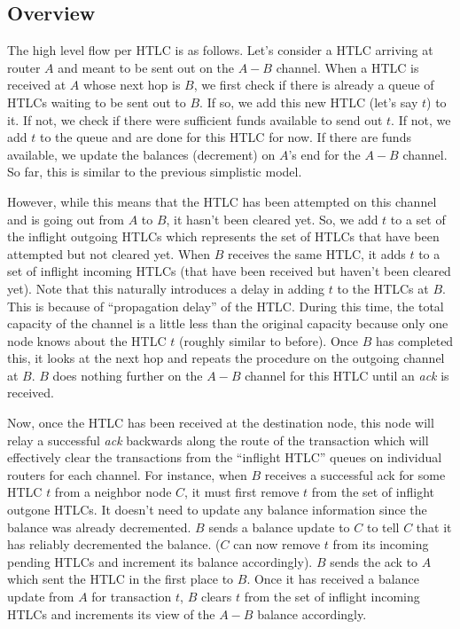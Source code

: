 \documentclass[a4paper]{article}
\newcommand{\NewPara}[1]{\noindent{\bf #1}}
\begin{document}
\subsection{Overview}
\NewPara{Sending out HTLCs} The high level flow per HTLC is as follows. Let's consider a HTLC arriving at router $A$ and meant to be sent out on the $A-B$ channel. When a HTLC is received at 
$A$ whose next hop is $B$, we first check if there is already a queue of HTLCs waiting to be sent out to $B$. If so, we add this new HTLC (let's say $t$) to it. If not, we check 
if there were sufficient funds available to send out $t$. If not, we add $t$ to the queue and are done for this HTLC for now. If there are funds available, 
we update the balances (decrement) on $A$'s end for the $A-B$ channel. So far, this is similar to the previous simplistic model. 

However, while this means that the HTLC has been attempted on this channel and is going out from $A$ to $B$, it hasn't been cleared yet. So, we add $t$ to a set of the inflight
outgoing HTLCs which represents the set of HTLCs that have been attempted but not cleared yet. When $B$ receives the same HTLC, it adds $t$ to a set of inflight incoming HTLCs 
(that have been received but haven't been cleared yet). Note that this naturally introduces a delay in adding $t$ to the HTLCs at $B$.
This is because of ``propagation delay'' of the HTLC. During this time, the total capacity of the channel is a little less than the original capacity because only one node knows
about the HTLC $t$ (roughly similar to before). Once $B$ has completed this, it looks at the next hop and repeats the procedure on the outgoing channel at $B$. $B$ does nothing further
on the $A-B$ channel for this HTLC until an {\em{ack}} is received.

\bigskip

\NewPara{Responding to Successful Acks} Now, once the HTLC has been received at the destination node, this node will relay a successful {\em{ack}} backwards along the route of the transaction which will effectively clear 
the transactions from the ``inflight HTLC'' queues on individual routers for each channel. For instance, when $B$ receives a successful ack for some HTLC
$t$ from a neighbor node $C$, it must first remove $t$ from the set of inflight outgone HTLCs. It doesn't need to update
any balance information since the balance was already decremented. $B$ sends a balance update to $C$ to tell $C$ that it has reliably decremented the balance. ($C$ can now remove $t$ from its incoming pending HTLCs and 
increment its balance accordingly).
$B$ sends the ack to $A$ which sent the HTLC in the first place to $B$. Once it has received a balance update from $A$ for transaction $t$, $B$ clears $t$ from
the set of inflight incoming HTLCs and increments its view of the $A-B$ balance accordingly.
\end{document}
